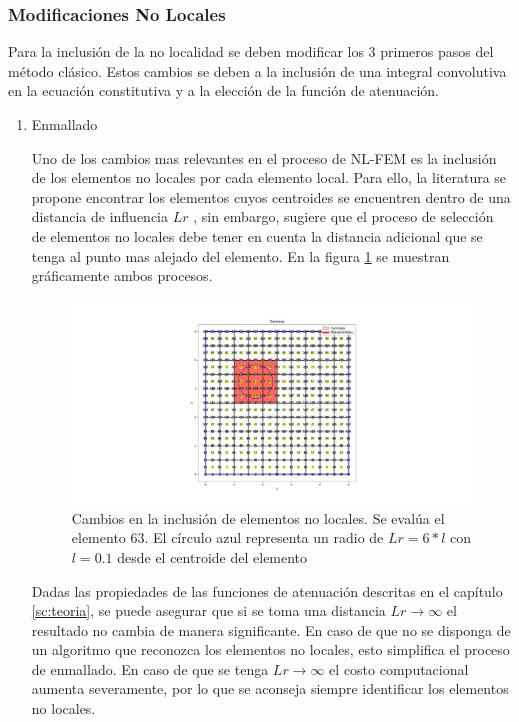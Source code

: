 		\subsubsection{Modificaciones No Locales}
		Para la inclusión de la no localidad se deben modificar los 3 primeros pasos del método clásico. Estos cambios se deben a la inclusión de una integral convolutiva en la ecuación constitutiva y a la elección de la función de atenuación.
			\begin{enumerate}
				\item Enmallado

				Uno de los cambios mas relevantes en el proceso de NL-FEM es la inclusión de los elementos no locales por cada elemento local. Para ello, la literatura se propone encontrar los elementos cuyos centroides se encuentren dentro de una distancia de influencia $Lr$ \parencite{article}, sin embargo, \cite{ProgramaEnmallado} sugiere que el proceso de selección de elementos no locales debe tener en cuenta la distancia adicional que se tenga al punto mas alejado del elemento. En la figura \ref{fig:nolocales_lr_cambios} se muestran gráficamente ambos procesos.

				\begin{figure}
					\centering
					\sffamily
					\includegraphics[width=\textwidth]{figuras/diferenciasLr.pdf}
					\caption{Cambios en la inclusión de elementos no locales. Se evalúa el elemento 63. El círculo azul representa un radio de $Lr=6*l$ con $l=0.1$ desde el centroide del elemento}
					\label{fig:nolocales_lr_cambios}
				\end{figure}

				Dadas las propiedades de las funciones de atenuación descritas en el capítulo \ref{sc:teoria}, se puede asegurar que si se toma una distancia $Lr\rightarrow\infty$ el resultado no cambia de manera significante. En caso de que no se disponga de un algoritmo que reconozca los elementos no locales, esto simplifica el proceso de enmallado. En caso de que se tenga $Lr\rightarrow\infty$ el costo computacional aumenta severamente, por lo que se aconseja siempre identificar los elementos no locales.


\end{enumerate}
